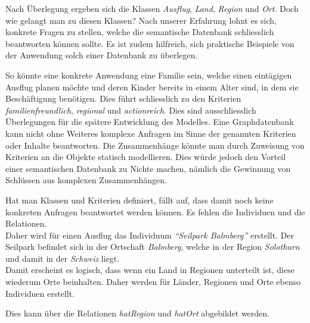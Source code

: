 Nach Überlegung ergeben sich die Klassen \textit{Ausflug}, \textit{Land}, \textit{Region} und \textit{Ort}. Doch wie gelangt man zu diesen Klassen? Nach unserer Erfahrung lohnt es sich, konkrete Fragen zu stellen, welche die semantische Datenbank schliesslich beantworten können sollte. Es ist zudem hilfreich, sich praktische Beispiele von der Anwendung solch einer Datenbank zu überlegen.

So könnte eine konkrete Anwendung eine Familie sein, welche einen eintägigen Ausflug planen möchte und deren Kinder bereits in einem Alter sind, in dem sie Beschäftigung benötigen. Dies führt schliesslich zu den Kriterien \textit{familienfreundlich}, \textit{regional} und \textit{actionreich}. Dies sind ausschliesslich Überlegungen für die spätere Entwicklung des Modelles. Eine Graphdatenbank kann nicht ohne Weiteres komplexe Anfragen im Sinne der genannten Kriterien oder Inhalte beantworten. Die Zusammenhänge könnte man durch Zuweisung von Kriterien an die Objekte statisch modellieren. Dies würde jedoch den Vorteil einer semantischen Datenbank zu Nichte machen, nämlich die Gewinnung von Schlüssen aus komplexen Zusammenhängen.

Hat man Klassen und Kriterien definiert, fällt auf, dass damit noch keine konkreten Anfragen beantwortet werden können. Es fehlen die Individuen und die Relationen.\\
Daher wird für einen Ausflug das Individuum \textit{``Seilpark Balmberg''} erstellt. Der Seilpark befindet sich in der Ortschaft \textit{Balmberg}, welche in der Region \textit{Solothurn} und damit in der \textit{Schweiz} liegt.\\
Damit erscheint es logisch, dass wenn ein Land in Regionen unterteilt ist, diese wiederum Orte beinhalten. Daher werden für Länder, Regionen und Orte ebenso Individuen erstellt.

Dies kann über die Relationen \textit{hatRegion} und \textit{hatOrt} abgebildet werden.

